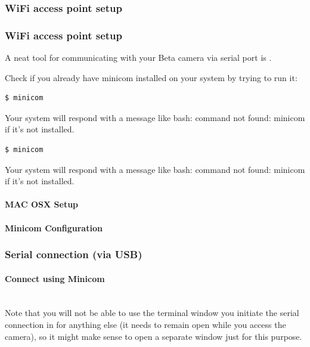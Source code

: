 \subsubsection{WiFi access point setup}

\subsubsection{WiFi access point setup}


A neat tool for communicating with your Beta camera via serial port is .

Check if you already have minicom installed on your system by trying to run it:

\begin{lstlisting}[language=bash,morekeywords=$,keywordstyle=\bfseries,frame=none,xleftmargin=.25in,belowskip=2em, aboveskip=2em]
$ minicom
\end{lstlisting}
Your system will respond with a message like bash: command not found: minicom if it's not installed.

\begin{lstlisting}[language=bash,morekeywords=$,keywordstyle=\bfseries,frame=none,xleftmargin=.25in,belowskip=2em, aboveskip=2em]
$ minicom
\end{lstlisting}

Your system will respond with a message like bash: command not found: minicom if it's not installed.





\paragraph{MAC OSX Setup}
\paragraph{Minicom Configuration}
\subsubsection{Serial connection (via USB)}
\paragraph{Connect using Minicom}\mbox{}\\
Note that you will not be able to use the terminal window you initiate the serial connection in for anything else (it needs to remain open while you access the camera), so it might make sense to open a separate window just for this purpose.

